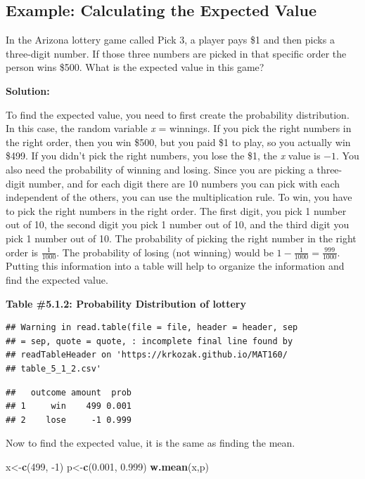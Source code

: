 \documentclass[
]{book}
\newenvironment{Shaded}{\begin{snugshade}}{\end{snugshade}}
\newcommand{\DecValTok}[1]{\textcolor[rgb]{0.00,0.00,0.81}{#1}}
\newcommand{\FloatTok}[1]{\textcolor[rgb]{0.00,0.00,0.81}{#1}}
\newcommand{\KeywordTok}[1]{\textcolor[rgb]{0.13,0.29,0.53}{\textbf{#1}}}
\newcommand{\NormalTok}[1]{#1}
\begin{document}
\hypertarget{example-calculating-the-expected-value}{%
\subsection{Example: Calculating the Expected Value}\label{example-calculating-the-expected-value}}

In the Arizona lottery game called Pick 3, a player pays \$1 and then picks a three-digit number. If those three numbers are picked in that specific order the person wins \$500. What is the expected value in this game?

\textbf{Solution:}

To find the expected value, you need to first create the probability distribution. In this case, the random variable \emph{x} = winnings. If you pick the right numbers in the right order, then you win \$500, but you paid \$1 to play, so you actually win \$499. If you didn't pick the right numbers, you lose the \$1, the \emph{x} value is \(-1\). You also need the probability of winning and losing. Since you are picking a three-digit number, and for each digit there are 10 numbers you can pick with each independent of the others, you can use the multiplication rule. To win, you have to pick the right numbers in the right order. The first digit, you pick 1 number out of 10, the second digit you pick 1 number out of 10, and the third digit you pick 1 number out of 10. The probability of picking the right number in the right order is \(\frac{1}{1000}\). The probability of losing (not winning) would be \(1-\frac{1}{1000}=\frac{999}{1000}\). Putting this information into a table will help to organize the information and find the expected value.

\textbf{Table \#5.1.2: Probability Distribution of lottery}

\begin{verbatim}
## Warning in read.table(file = file, header = header, sep
## = sep, quote = quote, : incomplete final line found by
## readTableHeader on 'https://krkozak.github.io/MAT160/
## table_5_1_2.csv'
\end{verbatim}

\begin{verbatim}
##   outcome amount  prob
## 1     win    499 0.001
## 2    lose     -1 0.999
\end{verbatim}

Now to find the expected value, it is the same as finding the mean.

\begin{Shaded}
\begin{Highlighting}[]
\NormalTok{x<-}\KeywordTok{c}\NormalTok{(}\DecValTok{499}\NormalTok{, }\DecValTok{-1}\NormalTok{)}
\NormalTok{p<-}\KeywordTok{c}\NormalTok{(}\FloatTok{0.001}\NormalTok{, }\FloatTok{0.999}\NormalTok{)}
\KeywordTok{w.mean}\NormalTok{(x,p)}
\end{Highlighting}
\end{Shaded}
\end{document}
